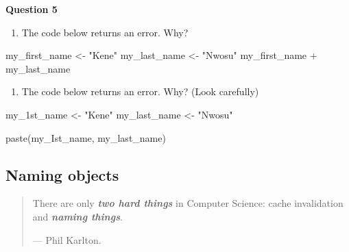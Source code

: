 \documentclass[
  letterpaper,
  DIV=11,
  numbers=noendperiod]{scrreprt}
\newenvironment{Shaded}{\begin{snugshade}}{\end{snugshade}}
\newcommand{\FunctionTok}[1]{\textcolor[rgb]{0.28,0.35,0.67}{#1}}
\newcommand{\NormalTok}[1]{\textcolor[rgb]{0.00,0.23,0.31}{#1}}
\newcommand{\OtherTok}[1]{\textcolor[rgb]{0.00,0.23,0.31}{#1}}
\newcommand{\SpecialCharTok}[1]{\textcolor[rgb]{0.37,0.37,0.37}{#1}}
\newcommand{\StringTok}[1]{\textcolor[rgb]{0.13,0.47,0.30}{#1}}
\providecommand{\tightlist}{%
  \setlength{\itemsep}{0pt}\setlength{\parskip}{0pt}}\usepackage{longtable,booktabs,array}
\begin{document}
\begin{tcolorbox}[enhanced jigsaw, colframe=quarto-callout-tip-color-frame, rightrule=.15mm, opacityback=0, breakable, coltitle=black, colbacktitle=quarto-callout-tip-color!10!white, bottomrule=.15mm, leftrule=.75mm, toprule=.15mm, arc=.35mm, bottomtitle=1mm, colback=white, left=2mm, opacitybacktitle=0.6, titlerule=0mm, title=\textcolor{quarto-callout-tip-color}{\faLightbulb}\hspace{0.5em}{Practice}, toptitle=1mm]

\textbf{Question 5}

\begin{enumerate}
\def\labelenumi{\alph{enumi}.}
\tightlist
\item
  The code below returns an error. Why?
\end{enumerate}

\begin{Shaded}
\begin{Highlighting}[]
\NormalTok{my\_first\_name }\OtherTok{\textless{}{-}} \StringTok{"Kene"}
\NormalTok{my\_last\_name }\OtherTok{\textless{}{-}} \StringTok{"Nwosu"}
\NormalTok{my\_first\_name }\SpecialCharTok{+}\NormalTok{ my\_last\_name}
\end{Highlighting}
\end{Shaded}

\begin{enumerate}
\def\labelenumi{\alph{enumi}.}
\setcounter{enumi}{1}
\tightlist
\item
  The code below returns an error. Why? (Look carefully)
\end{enumerate}

\begin{Shaded}
\begin{Highlighting}[]
\NormalTok{my\_1st\_name }\OtherTok{\textless{}{-}} \StringTok{"Kene"}
\NormalTok{my\_last\_name }\OtherTok{\textless{}{-}} \StringTok{"Nwosu"}

\FunctionTok{paste}\NormalTok{(my\_Ist\_name, my\_last\_name)}
\end{Highlighting}
\end{Shaded}

\end{tcolorbox}

\hypertarget{naming-objects}{%
\subsection{Naming objects}\label{naming-objects}}

\begin{quote}
There are only \textbf{\emph{two hard things}} in Computer Science:
cache invalidation and \textbf{\emph{naming things}}.

--- Phil Karlton.
\end{quote}
\end{document}
